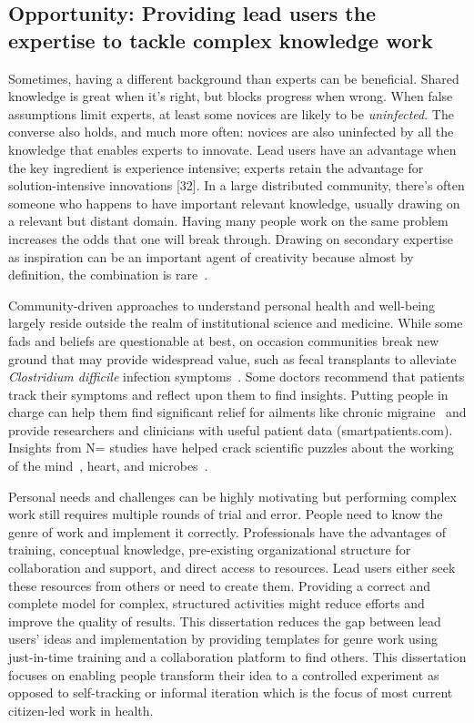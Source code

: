 \subsection{Opportunity: Providing lead users the expertise to tackle complex knowledge work}
Sometimes, having a different background
 than experts can be beneficial. Shared knowledge is great when it’s right, but blocks progress
 when wrong. When false assumptions limit experts, at least some novices are likely to be 
\textit{uninfected}. The converse also holds, and much more often: novices are also uninfected
by all the knowledge that enables experts to innovate. Lead users have an advantage when the key ingredient is experience intensive; experts retain the
advantage for solution-intensive innovations [32]. In a large distributed community, 
there’s often someone who happens to have important relevant knowledge, usually 
drawing on a relevant but distant domain. Having many people work on the same problem 
increases the odds that one will break through. Drawing on secondary expertise as 
inspiration can be an important agent of creativity because almost by definition, the
 combination is rare~\cite{Boden2004}. 

Community-driven approaches to understand personal
health and well-being largely reside outside the realm
of institutional science and medicine. While some fads and beliefs are 
questionable at best, on occasion communities
break new ground that may provide widespread value,
such as fecal transplants to alleviate \textit{Clostridium difficile} infection
symptoms~\cite{Brandt2012}. Some doctors recommend that patients
track their symptoms and reflect upon them to find
insights. Putting people in charge can help them find significant
relief for ailments like chronic migraine~\cite{Gawande2017} and provide
researchers and clinicians with useful patient data
(smartpatients.com). Insights from N\Hair= studies have helped
crack scientific puzzles about the working of the mind~\cite{V.S.Ramachandran1998},
heart, and microbes~\cite{Weisse2012}. 

Personal needs and challenges can be highly motivating but performing complex work still requires multiple rounds of trial and error. 
People need to know the genre of work and implement it correctly.  Professionals have the advantages of training, conceptual knowledge, 
pre-existing organizational structure for 
collaboration and support, and direct access to resources. Lead users either seek these resources from others or need to create them. 
Providing a correct and complete model for complex, structured activities might reduce efforts and improve the quality of results.
This dissertation reduces the gap between lead users' ideas and implementation by providing templates for 
genre work using just-in-time training and a collaboration platform to find others. This dissertation focuses on enabling people transform their idea to a controlled experiment as opposed to 
self-tracking or informal iteration which is the focus of most current citizen-led work in health.

